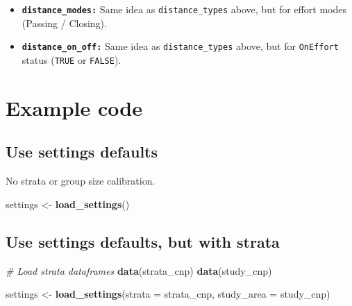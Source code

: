\documentclass[
]{book}
\newenvironment{Shaded}{\begin{snugshade}}{\end{snugshade}}
\newcommand{\CommentTok}[1]{\textcolor[rgb]{0.56,0.35,0.01}{\textit{#1}}}
\newcommand{\DataTypeTok}[1]{\textcolor[rgb]{0.13,0.29,0.53}{#1}}
\newcommand{\KeywordTok}[1]{\textcolor[rgb]{0.13,0.29,0.53}{\textbf{#1}}}
\newcommand{\NormalTok}[1]{#1}
\newcommand{\StringTok}[1]{\textcolor[rgb]{0.31,0.60,0.02}{#1}}
\begin{document}
\begin{itemize}
\item
  \textbf{\texttt{distance\_modes:}} Same idea as \texttt{distance\_types} above, but for effort modes (Passing / Closing).
\item
  \textbf{\texttt{distance\_on\_off:}} Same idea as \texttt{distance\_types} above, but for \texttt{OnEffort} status (\texttt{TRUE} or \texttt{FALSE}).
\end{itemize}

\hypertarget{example-code}{%
\section*{Example code}\label{example-code}}

\hypertarget{use-settings-defaults}{%
\subsection*{Use settings defaults}\label{use-settings-defaults}}

No strata or group size calibration.

\begin{Shaded}
\begin{Highlighting}[]
\NormalTok{settings <-}\StringTok{ }\KeywordTok{load_settings}\NormalTok{()}
\end{Highlighting}
\end{Shaded}

\hypertarget{use-settings-defaults-but-with-strata}{%
\subsection*{Use settings defaults, but with strata}\label{use-settings-defaults-but-with-strata}}

\begin{Shaded}
\begin{Highlighting}[]
\CommentTok{# Load strata dataframes}
\KeywordTok{data}\NormalTok{(strata_cnp)}
\KeywordTok{data}\NormalTok{(study_cnp)}

\NormalTok{settings <-}\StringTok{ }\KeywordTok{load_settings}\NormalTok{(}\DataTypeTok{strata =}\NormalTok{ strata_cnp,}
                          \DataTypeTok{study_area =}\NormalTok{ study_cnp)}
\end{Highlighting}
\end{Shaded}
\end{document}
